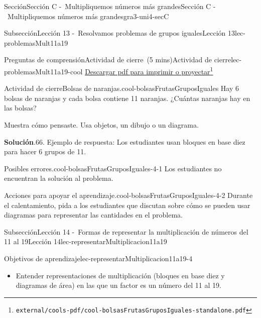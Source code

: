 \documentclass[oneside,10pt,]{article}
\newcommand{\blocktitlefont}{\relax}
\begin{document}
\begin{sectionptx}{Sección}{Sección C -~Multipliquemos números más grandes}{}{Sección C -~Multipliquemos números más grandes}{}{}{gra3-uni4-secC}
\begin{subsectionptx}{Subsección}{Lección 13 -~Resolvamos problemas de grupos iguales}{}{Lección 13}{}{}{lec-problemasMult11a19}
\begin{reading-questions-subsubsection}{Preguntas de comprensión}{Actividad de cierre~(5 mins)}{}{Actividad de cierre}{}{}{lec-problemasMult11a19-cool}
\href{external/cools-pdf/cool-bolsasFrutasGruposIguales-standalone.pdf}{Descargar pdf para imprimir o proyectar}\footnote{\nolinkurl{external/cools-pdf/cool-bolsasFrutasGruposIguales-standalone.pdf}\label{lec-problemasMult11a19-cool-5}}\begin{project}{Actividad de cierre}{Bolsas de naranjas.}{cool-bolsasFrutasGruposIguales}%
Hay 6 bolsas de naranjas y cada bolsa contiene 11 naranjas. ¿Cuántas naranjas hay en las bolsas?%
\par
Muestra cómo pensaste. Usa objetos, un dibujo o un diagrama.%
\par\smallskip%
\noindent\textbf{\blocktitlefont Solución}.\hypertarget{cool-bolsasFrutasGruposIguales-3}{}\quad{}66. Ejemplo de respuesta: Los estudiantes usan bloques en base diez para hacer 6 grupos de 11.%
\end{project}%
\par
\begin{paragraphs}{Posibles errores.}{cool-bolsasFrutasGruposIguales-4-1}%
Los estudiantes no encuentran la solución al problema.%
\end{paragraphs}%
\begin{paragraphs}{Acciones para apoyar el aprendizaje.}{cool-bolsasFrutasGruposIguales-4-2}%
Durante el calentamiento, pida a los estudiantes que discutan sobre cómo se pueden usar diagramas para representar las cantidades en el problema.%
\end{paragraphs}%
\end{reading-questions-subsubsection}
\end{subsectionptx}
%
%
\typeout{************************************************}
\typeout{************************************************}
%
\begin{subsectionptx}{Subsección}{Lección 14 -~Formas de representar la multiplicación de números del 11 al 19}{}{Lección 14}{}{}{lec-representarMultiplicacion11a19}
\begin{objectives}{Objetivos de aprendizaje}{lec-representarMultiplicacion11a19-4}
%
\begin{itemize}[label=\textbullet]
\item{}Entender representaciones de multiplicación (bloques en base diez y diagramas de área) en las que un factor es un número del 11 al 19.%
\end{itemize}
\end{objectives}
\begin{introduction}{}%

\end{introduction}
\end{subsectionptx}
\end{sectionptx}
\end{document}
